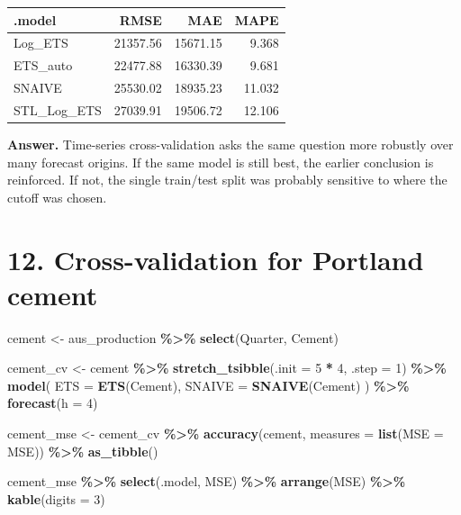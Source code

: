 \documentclass[
  11pt,
]{article}
\newenvironment{Shaded}{\begin{snugshade}}{\end{snugshade}}
\newcommand{\AttributeTok}[1]{\textcolor[rgb]{0.13,0.29,0.53}{#1}}
\newcommand{\DecValTok}[1]{\textcolor[rgb]{0.00,0.00,0.81}{#1}}
\newcommand{\FunctionTok}[1]{\textcolor[rgb]{0.13,0.29,0.53}{\textbf{#1}}}
\newcommand{\NormalTok}[1]{#1}
\newcommand{\OtherTok}[1]{\textcolor[rgb]{0.56,0.35,0.01}{#1}}
\newcommand{\SpecialCharTok}[1]{\textcolor[rgb]{0.81,0.36,0.00}{\textbf{#1}}}
\newcounter{none} %
\begin{document}
{\def\LTcaptype{none} %
\begin{longtable}[]{@{}lrrr@{}}
\toprule\noalign{}
.model & RMSE & MAE & MAPE \\
\midrule\noalign{}
\endhead
\bottomrule\noalign{}
\endlastfoot
Log\_ETS & 21357.56 & 15671.15 & 9.368 \\
ETS\_auto & 22477.88 & 16330.39 & 9.681 \\
SNAIVE & 25530.02 & 18935.23 & 11.032 \\
STL\_Log\_ETS & 27039.91 & 19506.72 & 12.106 \\
\end{longtable}
}

\textbf{Answer.} Time-series cross-validation asks the same question
more robustly over many forecast origins. If the same model is still
best, the earlier conclusion is reinforced. If not, the single
train/test split was probably sensitive to where the cutoff was chosen.

\section{12. Cross-validation for Portland
cement}\label{cross-validation-for-portland-cement}

\begin{Shaded}
\begin{Highlighting}[]
\NormalTok{cement }\OtherTok{\textless{}{-}}\NormalTok{ aus\_production }\SpecialCharTok{\%\textgreater{}\%} \FunctionTok{select}\NormalTok{(Quarter, Cement)}

\NormalTok{cement\_cv }\OtherTok{\textless{}{-}}\NormalTok{ cement }\SpecialCharTok{\%\textgreater{}\%}
  \FunctionTok{stretch\_tsibble}\NormalTok{(}\AttributeTok{.init =} \DecValTok{5} \SpecialCharTok{*} \DecValTok{4}\NormalTok{, }\AttributeTok{.step =} \DecValTok{1}\NormalTok{) }\SpecialCharTok{\%\textgreater{}\%}
  \FunctionTok{model}\NormalTok{(}
    \AttributeTok{ETS =} \FunctionTok{ETS}\NormalTok{(Cement),}
    \AttributeTok{SNAIVE =} \FunctionTok{SNAIVE}\NormalTok{(Cement)}
\NormalTok{  ) }\SpecialCharTok{\%\textgreater{}\%}
  \FunctionTok{forecast}\NormalTok{(}\AttributeTok{h =} \DecValTok{4}\NormalTok{)}

\NormalTok{cement\_mse }\OtherTok{\textless{}{-}}\NormalTok{ cement\_cv }\SpecialCharTok{\%\textgreater{}\%}
  \FunctionTok{accuracy}\NormalTok{(cement, }\AttributeTok{measures =} \FunctionTok{list}\NormalTok{(}\AttributeTok{MSE =}\NormalTok{ MSE)) }\SpecialCharTok{\%\textgreater{}\%}
  \FunctionTok{as\_tibble}\NormalTok{()}

\NormalTok{cement\_mse }\SpecialCharTok{\%\textgreater{}\%}
  \FunctionTok{select}\NormalTok{(.model, MSE) }\SpecialCharTok{\%\textgreater{}\%}
  \FunctionTok{arrange}\NormalTok{(MSE) }\SpecialCharTok{\%\textgreater{}\%}
  \FunctionTok{kable}\NormalTok{(}\AttributeTok{digits =} \DecValTok{3}\NormalTok{)}
\end{Highlighting}
\end{Shaded}
\end{document}
